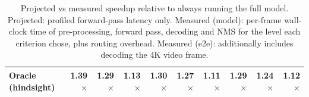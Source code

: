 \begin{table}[t]
\begin{tabular}{lrrrrrrrrr}
\midrule
Oracle (hindsight) & 1.39$\times$ & 1.29$\times$ & 1.13$\times$ & 1.30$\times$ & 1.27$\times$ & 1.11$\times$ & 1.29$\times$ & 1.24$\times$ & 1.12$\times$ \\
\bottomrule
\end{tabular}
\caption{Projected vs measured speedup relative to always running the full model. Projected: profiled forward-pass latency only. Measured (model): per-frame wall-clock time of pre-processing, forward pass, decoding and NMS for the level each criterion chose, plus routing overhead. Measured (e2e): additionally includes decoding the 4K video frame.}
\label{tab:speedup-measured}
\end{table}
